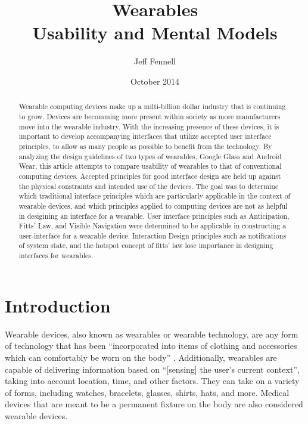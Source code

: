 \documentclass[12pt]{article}
\begin{document}
\begin{abstract}
Wearable computing devices make up a milti-billion dollar industry that is continuing to grow. Devices are becomming more present within society as more manufacturers move into the wearable industry. With the increasing presence of these devices, it is important to develop accompanying interfaces that utilize accepted user interface principles, to allow as many people as possible to benefit from the technology. By analyzing the design guidelines of two types of wearables, Google Glass and Android Wear, this article attempts to compare usability of wearables to that of conventional computing devices. Accepted principles for good interface design are held up against the physical constraints and intended use of the devices. The goal was to determine which traditional interface principles which are particularly applicable in the context of wearable devices, and which principles applied to computing devices are not as helpful in desigining an interface for a wearable. User interface principles such as Anticipation, Fitts' Law, and Visible Navigation were determined to be applicable in constructing a user-interface for a wearable device. Interaction Design principles such as notifications of system state, and the hotspot concept of fitts' law lose importance in designing interfaces for wearables.

\end{abstract}

\title{Wearables \\ \vspace{2 mm} {\large Usability and Mental Models}}
\author{Jeff Fennell}
\date{October 2014}
\maketitle

\tableofcontents

\section{Introduction}
Wearable devices, also known as wearables or wearable technology, are any form of technology that has been ``incorporated into items of clothing and accessories which can comfortably be worn on the body'' \cite{wd}. Additionally, wearables are capable of delivering information based on ``[sensing] the user's current context'', taking into account location, time, and other factors\cite{star}. They can take on a variety of forms, including watches, bracelets, glasses, shirts, hats, and more. Medical devices that are meant to be a permanent fixture on the body are also considered wearable devices.
\end{document}
